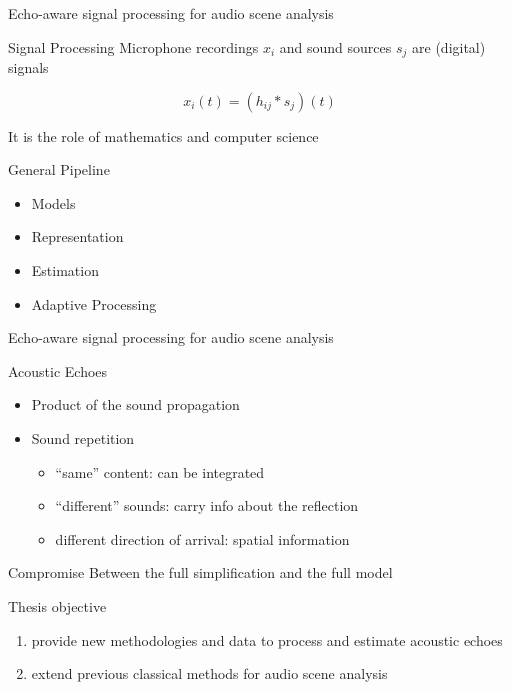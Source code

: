 \begin{frame}{Echo-aware \alert{signal processing} for audio scene analysis}

    \begin{block}{Signal Processing}
        Microphone recordings $x_i$ and sound sources $s_j$ are (digital) signals

        \begin{equation*}
            x_i(t) = (h_{ij} \ast s_j)(t)
        \end{equation*}

        It is the role of mathematics and computer science

    \end{block}

    \begin{block}{General Pipeline}
        \begin{itemize}
            \item Models
            \item Representation
            \item Estimation
            \item Adaptive Processing
        \end{itemize}
    \end{block}
\end{frame}

\begin{frame}{\alert{Echo-aware} signal processing for audio scene analysis}

    \begin{block}{Acoustic Echoes}
        \begin{itemize}
            \item Product of the sound propagation
            \item Sound repetition
            \begin{itemize}
                \item ``same'' content: can be integrated
                \item ``different'' sounds: carry info about the reflection
                \item different direction of arrival: spatial information
            \end{itemize}
        \end{itemize}
    \end{block}

    \begin{block}{Compromise}
    Between the full simplification and the full model
    \end{block}

    \begin{block}{Thesis objective}
        \begin{enumerate}
            \item provide new methodologies and data to process and estimate acoustic echoes
            \item extend previous classical methods for audio scene analysis
        \end{enumerate}
    \end{block}
\end{frame}


